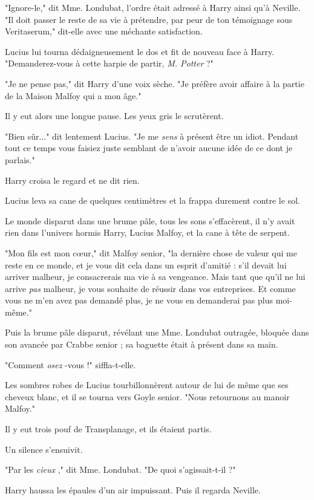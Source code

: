 "Ignore-le," dit Mme. Londubat, l'ordre était adressé à Harry ainsi qu'à Neville. "Il doit passer le reste de sa vie à prétendre, par peur de ton témoignage sous Veritaserum," dit-elle avec une méchante satisfaction.

Lucius lui tourna dédaigneusement le dos et fit de nouveau face à Harry. "Demanderez-vous à cette harpie de partir, \emph{M. Potter}  ?"

"Je ne pense pas," dit Harry d'une voix sèche. "Je préfère avoir affaire à la partie de la Maison Malfoy qui a mon âge."

Il y eut alors une longue pause. Les yeux gris le scrutèrent.

"Bien sûr..." dit lentement Lucius. "Je me \emph{sens}  à présent être un idiot. Pendant tout ce temps vous faisiez juste semblant de n'avoir aucune idée de ce dont je parlais."

Harry croisa le regard et ne dit rien.

Lucius leva sa cane de quelques centimètres et la frappa durement contre le sol.

Le monde disparut dans une brume pâle, tous les sons s'effacèrent, il n'y avait rien dans l'univers hormis Harry, Lucius Malfoy, et la cane à tête de serpent.

"Mon fils est mon cœur," dit Malfoy senior, "la dernière chose de valeur qui me reste en ce monde, et je vous dit cela dans un esprit d'amitié : s'il devait lui arriver malheur, je consacrerais ma vie à sa vengeance. Mais tant que qu'il ne lui arrive \emph{pas}  malheur, je vous souhaite de réussir dans vos entreprises. Et comme vous ne m'en avez pas demandé plus, je ne vous en demanderai pas plus moi-même."

Puis la brume pâle disparut, révélant une Mme. Londubat outragée, bloquée dans son avancée par Crabbe senior ; sa baguette était à présent dans sa main.

"Comment \emph{osez} -vous !" siffla-t-elle.

Les sombres robes de Lucius tourbillonnèrent autour de lui de même que ses cheveux blanc, et il se tourna vers Goyle senior. "Nous retournons au manoir Malfoy."

Il y eut trois pouf de Transplanage, et ils étaient partis.

Un silence s'ensuivit.

"Par les \emph{cieux} ," dit Mme. Londubat. "De quoi s'agissait-t-il ?"

Harry haussa les épaules d'un air impuissant. Puis il regarda Neville.

